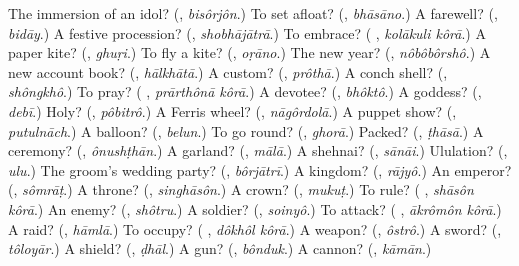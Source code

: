 \begin{tcolorbox}[breakable,colback=teal!4,colframe=teal!35!black,title={Before you move on}]
The immersion of an idol? (\textbf{}, \emph{bisôrjôn}.) To set afloat? (\textbf{}, \emph{bhāsāno}.) A farewell? (\textbf{}, \emph{bidāy}.) A festive procession? (\textbf{}, \emph{shobhājātrā}.) To embrace? (\textbf{ }, \emph{kolākuli kôrā}.) A paper kite? (\textbf{}, \emph{ghuṛi}.) To fly a kite? (\textbf{}, \emph{oṛāno}.) The new year? (\textbf{}, \emph{nôbôbôrshô}.) A new account book? (\textbf{}, \emph{hālkhātā}.) A custom? (\textbf{}, \emph{prôthā}.) A conch shell? (\textbf{}, \emph{shôngkhô}.) To pray? (\textbf{ }, \emph{prārthônā kôrā}.) A devotee? (\textbf{}, \emph{bhôktô}.) A goddess? (\textbf{}, \emph{debī}.) Holy? (\textbf{}, \emph{pôbitrô}.) A Ferris wheel? (\textbf{}, \emph{nāgôrdolā}.) A puppet show? (\textbf{}, \emph{putulnāch}.) A balloon? (\textbf{}, \emph{belun}.) To go round? (\textbf{}, \emph{ghorā}.) Packed? (\textbf{}, \emph{ṭhāsā}.) A ceremony? (\textbf{}, \emph{ônushṭhān}.) A garland? (\textbf{}, \emph{mālā}.) A shehnai? (\textbf{}, \emph{sānāi}.) Ululation? (\textbf{}, \emph{ulu}.) The groom's wedding party? (\textbf{}, \emph{bôrjātrī}.) A kingdom? (\textbf{}, \emph{rājyô}.) An emperor? (\textbf{}, \emph{sômrāṭ}.) A throne? (\textbf{}, \emph{singhāsôn}.) A crown? (\textbf{}, \emph{mukuṭ}.) To rule? (\textbf{ }, \emph{shāsôn kôrā}.) An enemy? (\textbf{}, \emph{shôtru}.) A soldier? (\textbf{}, \emph{soinyô}.) To attack? (\textbf{ }, \emph{ākrômôn kôrā}.) A raid? (\textbf{}, \emph{hāmlā}.) To occupy? (\textbf{ }, \emph{dôkhôl kôrā}.) A weapon? (\textbf{}, \emph{ôstrô}.) A sword? (\textbf{}, \emph{tôloyār}.) A shield? (\textbf{}, \emph{ḍhāl}.) A gun? (\textbf{}, \emph{bônduk}.) A cannon? (\textbf{}, \emph{kāmān}.)
\end{tcolorbox}
